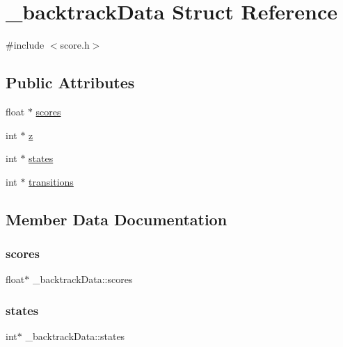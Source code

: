 \hypertarget{struct__backtrackData}{}\section{\+\_\+backtrack\+Data Struct Reference}
\label{struct__backtrackData}


{\ttfamily \#include $<$score.\+h$>$}

\subsection*{Public Attributes}
\begin{DoxyCompactItemize}
\item 
float $\ast$ \hyperlink{struct__backtrackData_af803a69e3c75e33c0ba7df036642c44d}{scores}
\item 
int $\ast$ \hyperlink{struct__backtrackData_a72e1450e2610bee1d867d8428f33a2cc}{z}
\item 
int $\ast$ \hyperlink{struct__backtrackData_a5dc8d2471b3ad228bfba4b4a4638ac85}{states}
\item 
int $\ast$ \hyperlink{struct__backtrackData_ac559f1f5976ad99432828f9f9ea7f218}{transitions}
\end{DoxyCompactItemize}


\subsection{Member Data Documentation}
\mbox{\label{struct__backtrackData_af803a69e3c75e33c0ba7df036642c44d}} 
\subsubsection{\texorpdfstring{scores}{scores}}
{\footnotesize\ttfamily float$\ast$ \+\_\+backtrack\+Data\+::scores}

\mbox{\label{struct__backtrackData_a5dc8d2471b3ad228bfba4b4a4638ac85}} 
\subsubsection{\texorpdfstring{states}{states}}
{\footnotesize\ttfamily int$\ast$ \+\_\+backtrack\+Data\+::states}

